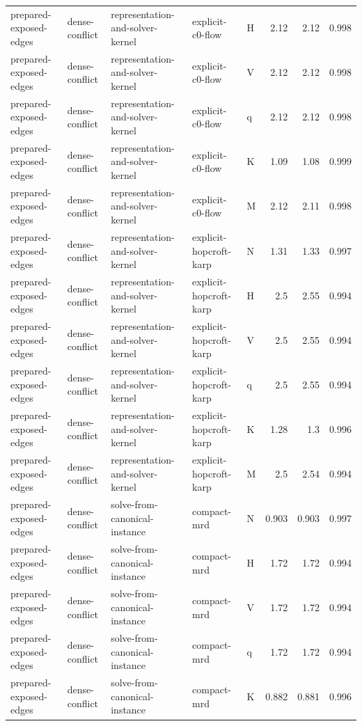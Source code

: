 \begin{table}[t]
\begin{tabular}{lllllrrr}
prepared-exposed-edges & dense-conflict & representation-and-solver-kernel & explicit-c0-flow & H & 2.12 & 2.12 & 0.998 \\
prepared-exposed-edges & dense-conflict & representation-and-solver-kernel & explicit-c0-flow & V & 2.12 & 2.12 & 0.998 \\
prepared-exposed-edges & dense-conflict & representation-and-solver-kernel & explicit-c0-flow & q & 2.12 & 2.12 & 0.998 \\
prepared-exposed-edges & dense-conflict & representation-and-solver-kernel & explicit-c0-flow & K & 1.09 & 1.08 & 0.999 \\
prepared-exposed-edges & dense-conflict & representation-and-solver-kernel & explicit-c0-flow & M & 2.12 & 2.11 & 0.998 \\
prepared-exposed-edges & dense-conflict & representation-and-solver-kernel & explicit-hopcroft-karp & N & 1.31 & 1.33 & 0.997 \\
prepared-exposed-edges & dense-conflict & representation-and-solver-kernel & explicit-hopcroft-karp & H & 2.5 & 2.55 & 0.994 \\
prepared-exposed-edges & dense-conflict & representation-and-solver-kernel & explicit-hopcroft-karp & V & 2.5 & 2.55 & 0.994 \\
prepared-exposed-edges & dense-conflict & representation-and-solver-kernel & explicit-hopcroft-karp & q & 2.5 & 2.55 & 0.994 \\
prepared-exposed-edges & dense-conflict & representation-and-solver-kernel & explicit-hopcroft-karp & K & 1.28 & 1.3 & 0.996 \\
prepared-exposed-edges & dense-conflict & representation-and-solver-kernel & explicit-hopcroft-karp & M & 2.5 & 2.54 & 0.994 \\
prepared-exposed-edges & dense-conflict & solve-from-canonical-instance & compact-mrd & N & 0.903 & 0.903 & 0.997 \\
prepared-exposed-edges & dense-conflict & solve-from-canonical-instance & compact-mrd & H & 1.72 & 1.72 & 0.994 \\
prepared-exposed-edges & dense-conflict & solve-from-canonical-instance & compact-mrd & V & 1.72 & 1.72 & 0.994 \\
prepared-exposed-edges & dense-conflict & solve-from-canonical-instance & compact-mrd & q & 1.72 & 1.72 & 0.994 \\
prepared-exposed-edges & dense-conflict & solve-from-canonical-instance & compact-mrd & K & 0.882 & 0.881 & 0.996 \\

\end{tabular}
\end{table}

